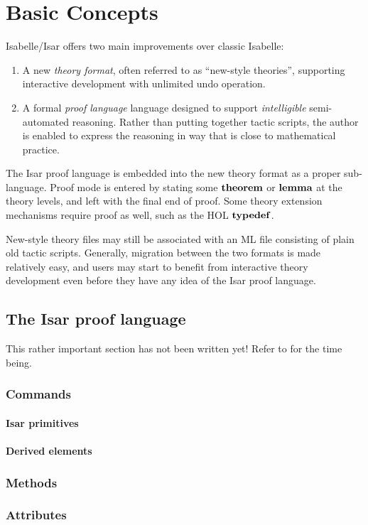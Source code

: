 
\chapter{Basic Concepts}\label{ch:basics}

Isabelle/Isar offers two main improvements over classic Isabelle:
\begin{enumerate}
\item A new \emph{theory format}, often referred to as ``new-style theories'',
  supporting interactive development with unlimited undo operation.
\item A formal \emph{proof language} language designed to support
  \emph{intelligible} semi-automated reasoning.  Rather than putting together
  tactic scripts, the author is enabled to express the reasoning in way that
  is close to mathematical practice.
\end{enumerate}

The Isar proof language is embedded into the new theory format as a proper
sub-language.  Proof mode is entered by stating some ${\mathord{\mathbf{theorem}}}$ or
${\mathord{\mathbf{lemma}}}$ at the theory levels, and left with the final end of proof.  Some
theory extension mechanisms require proof as well, such as the HOL
${\mathord{\mathbf{typedef}}}$.

New-style theory files may still be associated with an ML file consisting of
plain old tactic scripts.  Generally, migration between the two formats is
made relatively easy, and users may start to benefit from interactive theory
development even before they have any idea of the Isar proof language.


\section{The Isar proof language}

This rather important section has not been written yet!  Refer to
\cite{Wenzel:1999:TPHOL} for the time being.

\subsection{Commands}

\subsubsection{Isar primitives}

\subsubsection{Derived elements}


\subsection{Methods}

\subsection{Attributes}


